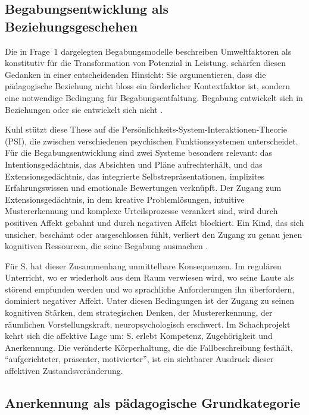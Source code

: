 \documentclass[ngerman, a4paper]{article}
\begin{document}
\subsection{Begabungsentwicklung als Beziehungsgeschehen}

Die in Frage~1 dargelegten Begabungsmodelle beschreiben Umweltfaktoren als
konstitutiv für die Transformation von Potenzial in Leistung. \textcite{kuhl2019diversitaet}
schärfen diesen Gedanken in einer entscheidenden Hinsicht: Sie argumentieren, dass
die pädagogische Beziehung nicht bloss ein förderlicher Kontextfaktor ist, sondern
eine notwendige Bedingung für Begabungsentfaltung. Begabung entwickelt sich in
Beziehungen oder sie entwickelt sich nicht \parencite{kuhl2019diversitaet}.

Kuhl stützt diese These auf die Persönlichkeits-System-Interaktionen-Theorie (PSI),
die zwischen verschiedenen psychischen Funktionssystemen unterscheidet. Für die
Begabungsentwicklung sind zwei Systeme besonders relevant: das Intentionsgedächtnis,
das Absichten und Pläne aufrechterhält, und das Extensionsgedächtnis, das integrierte
Selbstrepräsentationen, implizites Erfahrungswissen und emotionale Bewertungen
verknüpft. Der Zugang zum Extensionsgedächtnis, in dem kreative Problemlösungen,
intuitive Mustererkennung und komplexe Urteilsprozesse verankert sind, wird durch
positiven Affekt gebahnt und durch negativen Affekt blockiert. Ein Kind, das sich
unsicher, beschämt oder ausgeschlossen fühlt, verliert den Zugang zu genau jenen
kognitiven Ressourcen, die seine Begabung ausmachen
\parencite{kuhl2019diversitaet}.

Für S. hat dieser Zusammenhang unmittelbare Konsequenzen. Im regulären Unterricht,
wo er wiederholt aus dem Raum verwiesen wird, wo seine Laute als störend empfunden
werden und wo sprachliche Anforderungen ihn überfordern, dominiert negativer Affekt.
Unter diesen Bedingungen ist der Zugang zu seinen kognitiven Stärken, dem
strategischen Denken, der Mustererkennung, der räumlichen Vorstellungskraft,
neuropsychologisch erschwert. Im Schachprojekt kehrt sich die affektive Lage um:
S. erlebt Kompetenz, Zugehörigkeit und Anerkennung. Die veränderte Körperhaltung,
die die Fallbeschreibung festhält, \enquote{aufgerichteter, präsenter, motivierter},
ist ein sichtbarer Ausdruck dieser affektiven Zustandsveränderung.

\subsection{Anerkennung als pädagogische Grundkategorie}
\end{document}
